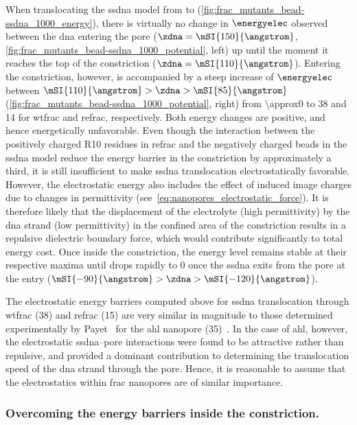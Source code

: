 When translocating the \gls{ssdna} model from \cisi{} to \transi{}
(\cref{fig:frac_mutants_bead-ssdna_1000_energy}), there is virtually no change in $\energyelec$ observed
between the \gls{dna} entering the pore ($\zdna = \mSI{150}{\angstrom}$,
\cref{fig:frac_mutants_bead-ssdna_1000_potential}, left) up until the moment it reaches the top of the
constriction ($\zdna = \mSI{110}{\angstrom}$). Entering the constriction, however, is accompanied by a steep
increase of $\energyelec$ between $ \mSI{110}{\angstrom} > \zdna > \mSI{85}{\angstrom}$
(\cref{fig:frac_mutants_bead-ssdna_1000_potential}, right) from \SI{\approx0}{\kT} to \SI{38}{\kT} and
\SI{14}{\kT} for \gls{wtfrac} and \gls{refrac}, respectively. Both energy changes are positive, and hence
energetically unfavorable. Even though the interaction between the positively charged R10 residues in
\gls{refrac} and the negatively charged beads in the \gls{ssdna} model reduce the energy barrier in the
constriction by approximately a third, it is still insufficient to make \gls{ssdna} translocation
electrostatically favorable. However, the electrostatic energy also includes the effect of induced image
charges due to changes in permittivity (see~\cref{eq:nanopores_electrostatic_force}). It is therefore likely
that the displacement of the electrolyte (high permittivity) by the \gls{dna} strand (low permittivity) in the
confined area of the constriction results in a repulsive dielectric boundary force, which would contribute
significantly to total energy cost. Once inside the constriction, the energy level remains stable at their
respective maxima until drops rapidly to \SI{0}{\kT} once the \gls{ssdna} exits from the pore at the \transi{}
entry ($\mSI{-90}{\angstrom} > \zdna > \mSI{-120}{\angstrom}$).

The electrostatic energy barriers computed above for \gls{ssdna} translocation through \gls{wtfrac}
(\SI{38}{\kT}) and \gls{refrac} (\SI{15}{\kT}) are very similar in magnitude to those determined
experimentally by Payet~\etal{} for the \gls{ahl} nanopore (\SI{35}{\kT})~\cite{Payet-2015}. In the case of
\gls{ahl}, however, the electrostatic \gls{ssdna}--pore interactions were found to be attractive rather than
repulsive, and provided a dominant contribution to determining the translocation speed of the \gls{dna} strand
through the pore. Hence, it is reasonable to assume that the electrostatics within \gls{frac} nanopores are of
similar importance.

\subsubsection{Overcoming the energy barriers inside the constriction.}
%

